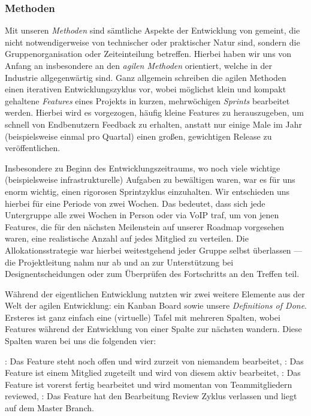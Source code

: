 
\subsubsection{Methoden}
\label{team:orga-workflow-methods}
\vspace{-0.4cm}

Mit unseren \emph{Methoden} sind sämtliche Aspekte der Entwicklung von \erasim{}
gemeint, die nicht notwendigerweise von technischer oder praktischer Natur sind,
sondern die Gruppenorganisation oder Zeiteinteilung betreffen. Hierbei haben wir
uns von Anfang an insbesondere an den \emph{agilen Methoden} orientiert, welche
in der Industrie allgegenwärtig sind. Ganz allgemein schreiben die agilen
Methoden einen iterativen Entwicklungszyklus vor, wobei möglichst klein und
kompakt gehaltene \emph{Features} eines Projekts in kurzen, mehrwöchigen
\emph{Sprints} bearbeitet werden. Hierbei wird es vorgezogen, häufig kleine
Features zu herauszugeben, um schnell von Endbenutzern Feedback zu erhalten,
anstatt nur einige Male im Jahr (beispielsweise einmal pro Quartal) einen
großen, gewichtigen Release zu veröffentlichen.

Insbesondere zu Beginn des Entwicklungszeitraums, wo noch viele wichtige
(beispielsweise infrastrukturelle) Aufgaben zu bewältigen waren, war es für uns
enorm wichtig, einen rigorosen Sprintzyklus einzuhalten. Wir entschieden uns
hierbei für eine Periode von zwei Wochen. Das bedeutet, dass sich jede
Untergruppe alle zwei Wochen in Person oder via VoIP traf, um von jenen
Features, die für den nächsten Meilenstein auf unserer Roadmap vorgesehen waren,
eine realistische Anzahl auf jedes Mitglied zu verteilen. Die
Allokationsstrategie war hierbei weitestgehend jeder Gruppe selbst überlassen
--- die Projektleitung nahm nur ab und an zur Unterstützung bei
Designentscheidungen oder zum Überprüfen des Fortschritts an den Treffen teil.

Während der eigentlichen Entwicklung nutzten wir zwei weitere Elemente aus der
Welt der agilen Entwicklung: ein Kanban Board sowie unsere \emph{Definitions
of Done}. Ersteres ist ganz einfach eine (virtuelle) Tafel mit mehreren Spalten,
wobei Features während der Entwicklung von einer Spalte zur nächsten wandern.
Diese Spalten waren bei uns die folgenden vier:
\begin{senumerate}{-0.5cm}
  : Das Feature steht noch offen und wird zurzeit von niemandem
  bearbeitet,
  : Das Feature ist einem Mitglied zugeteilt und wird von
  diesem aktiv bearbeitet,
  : Das Feature ist vorerst fertig bearbeitet und wird momentan
  von Teammitgliedern reviewed,
  : Das Feature hat den Bearbeitung \cyclearrow Review Zyklus verlassen und liegt auf dem Master Branch.
\end{senumerate}
\vspace{-0.5cm}

